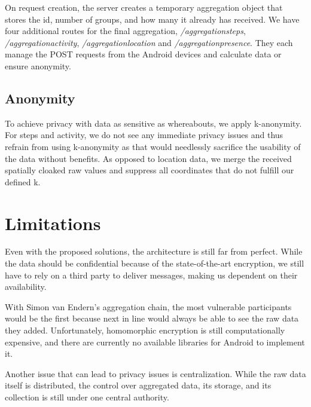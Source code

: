 On request creation, the server creates a temporary aggregation object that stores the id, number of groups, and how many it already has received. We have four additional routes for the final aggregation, \textit{/aggregationsteps}, \textit{/aggregationactivity}, \textit{/aggregationlocation} and \textit{/aggregationpresence}. They each manage the POST requests from the Android devices and calculate data or ensure anonymity.

\subsection{Anonymity}
To achieve privacy with data as sensitive as whereabouts, we apply k-anonymity. For steps and activity, we do not see any immediate privacy issues and thus refrain from using k-anonymity as that would needlessly sacrifice the usability of the data without benefits. As opposed to location data, we merge the received spatially cloaked raw values and suppress all coordinates that do not fulfill our defined k. 

\section{Limitations}
Even with the proposed solutions, the architecture is still far from perfect. While the data should be confidential because of the state-of-the-art encryption, we still have to rely on a third party to deliver messages, making us dependent on their availability.

With Simon van Endern's aggregation chain, the most vulnerable participants would be the first because next in line would always be able to see the raw data they added. Unfortunately, homomorphic encryption is still computationally expensive, and there are currently no available libraries for Android to implement it.

Another issue that can lead to privacy issues is centralization. While the raw data itself is distributed, the control over aggregated data, its storage, and its collection is still under one central authority.